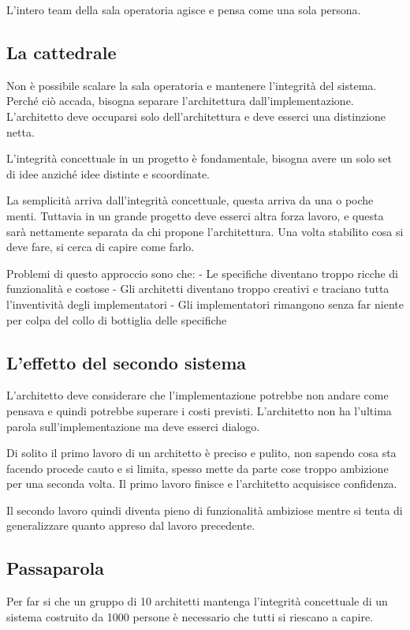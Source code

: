 \documentclass[a4paper,12pt,titlepage,oneside]{book}
\begin{document}
L'intero team della sala operatoria agisce e pensa come una sola persona.

\subsection{La cattedrale}
Non è possibile scalare la sala operatoria e mantenere l'integrità del sistema. Perché ciò accada, bisogna separare l'architettura dall'implementazione. L'architetto deve occuparsi solo dell'architettura e deve esserci una distinzione netta.

L'integrità concettuale in un progetto è fondamentale, bisogna avere un solo set di idee anziché idee distinte e scoordinate.

La semplicità arriva dall'integrità concettuale, questa arriva da una o poche menti. Tuttavia in un grande progetto deve esserci altra forza lavoro, e questa sarà nettamente separata da chi propone l'architettura. Una volta stabilito cosa si deve fare, si cerca di capire come farlo.

Problemi di questo approccio sono che:
- Le specifiche diventano troppo ricche di funzionalità e costose
- Gli architetti diventano troppo creativi e traciano tutta l'inventività degli implementatori
- Gli implementatori rimangono senza far niente per colpa del collo di bottiglia delle specifiche

\subsection{L'effetto del secondo sistema}
L'architetto deve considerare che l'implementazione potrebbe non andare come pensava e quindi potrebbe superare i costi previsti. L'architetto non ha l'ultima parola sull'implementazione ma deve esserci dialogo.

Di solito il primo lavoro di un architetto è preciso e pulito, non sapendo cosa sta facendo procede cauto e si limita, spesso mette da parte cose troppo ambizione per una seconda volta. Il primo lavoro finisce e l'architetto acquisisce confidenza.

Il secondo lavoro quindi diventa pieno di funzionalità ambiziose mentre si tenta di generalizzare quanto appreso dal lavoro precedente.

\subsection{Passaparola}
Per far si che un gruppo di 10 architetti mantenga l'integrità concettuale di un sistema costruito da 1000 persone è necessario che tutti si riescano a capire.
\end{document}
